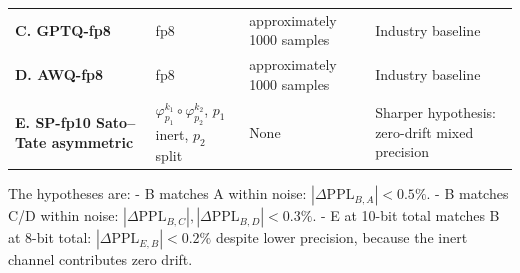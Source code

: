 \documentclass[
  11pt,
]{article}
\begin{document}
\begin{longtable}[]{@{}llll@{}}
\begin{minipage}[t]{0.22\columnwidth}\raggedright
\textbf{C. GPTQ-fp8}\strut
\end{minipage} & \begin{minipage}[t]{0.22\columnwidth}\raggedright
fp8\strut
\end{minipage} & \begin{minipage}[t]{0.22\columnwidth}\raggedright
approximately 1000 samples\strut
\end{minipage} & \begin{minipage}[t]{0.22\columnwidth}\raggedright
Industry baseline\strut
\end{minipage}\tabularnewline
\begin{minipage}[t]{0.22\columnwidth}\raggedright
\textbf{D. AWQ-fp8}\strut
\end{minipage} & \begin{minipage}[t]{0.22\columnwidth}\raggedright
fp8\strut
\end{minipage} & \begin{minipage}[t]{0.22\columnwidth}\raggedright
approximately 1000 samples\strut
\end{minipage} & \begin{minipage}[t]{0.22\columnwidth}\raggedright
Industry baseline\strut
\end{minipage}\tabularnewline
\begin{minipage}[t]{0.22\columnwidth}\raggedright
\textbf{E. SP-fp10 Sato--Tate asymmetric}\strut
\end{minipage} & \begin{minipage}[t]{0.22\columnwidth}\raggedright
\(\varphi_{p_1}^{k_1} \circ \varphi_{p_2}^{k_2}\), \(p_1\) inert,
\(p_2\) split\strut
\end{minipage} & \begin{minipage}[t]{0.22\columnwidth}\raggedright
None\strut
\end{minipage} & \begin{minipage}[t]{0.22\columnwidth}\raggedright
Sharper hypothesis: zero-drift mixed precision\strut
\end{minipage}\tabularnewline
\bottomrule
\end{longtable}

The hypotheses are: - B matches A within noise:
\(|\Delta\mathrm{PPL}_{B,A}| < 0.5\%\). - B matches C/D within noise:
\(|\Delta\mathrm{PPL}_{B,C}|, |\Delta\mathrm{PPL}_{B,D}| < 0.3\%\). - E
at 10-bit total matches B at 8-bit total:
\(|\Delta\mathrm{PPL}_{E,B}| < 0.2\%\) despite lower precision, because
the inert channel contributes zero drift.
\end{document}
